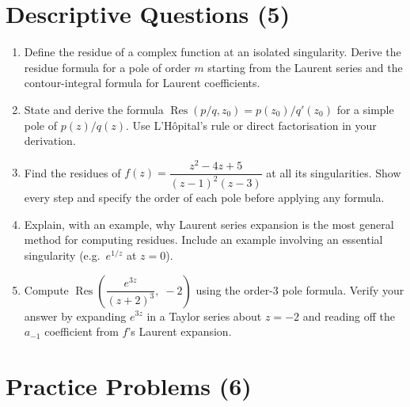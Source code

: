 \documentclass[12pt,a4paper]{article}
\begin{document}
\section{Descriptive Questions (5)}

\begin{enumerate}[leftmargin=*]
  \item Define the residue of a complex function at an isolated singularity.  Derive the residue
        formula for a pole of order $m$ starting from the Laurent series and the contour-integral
        formula for Laurent coefficients.

  \item State and derive the formula $\operatorname{Res}(p/q, z_0) = p(z_0)/q'(z_0)$ for a simple
        pole of $p(z)/q(z)$.  Use L'H\^{o}pital's rule or direct factorisation in your derivation.

  \item Find the residues of $f(z) = \dfrac{z^2 - 4z + 5}{(z-1)^2(z-3)}$ at all its singularities.
        Show every step and specify the order of each pole before applying any formula.

  \item Explain, with an example, why Laurent series expansion is the most general method for computing
        residues.  Include an example involving an essential singularity (e.g.\ $e^{1/z}$ at $z=0$).

  \item Compute $\operatorname{Res}\!\left(\dfrac{e^{3z}}{(z+2)^3},\; -2\right)$ using the
        order-3 pole formula.  Verify your answer by expanding $e^{3z}$ in a Taylor series
        about $z=-2$ and reading off the $a_{-1}$ coefficient from $f$'s Laurent expansion.
\end{enumerate}

\section{Practice Problems (6)}
\end{document}
